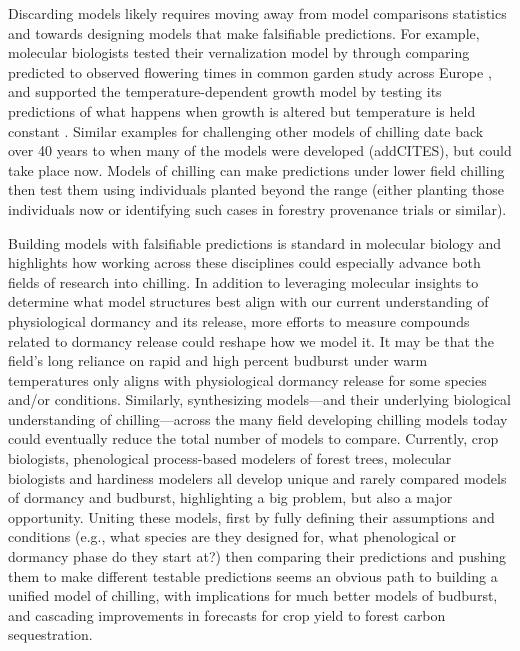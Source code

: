 \documentclass[11pt]{article}
\begin{document}
Discarding models likely requires moving away from model comparisons statistics and towards designing models that make falsifiable predictions. For example, molecular biologists tested their vernalization model by through comparing predicted to observed flowering times in common garden study across Europe \citep[][]{Wilczek:2009oa}, and supported the temperature-dependent growth model by testing its predictions of what happens when growth is altered but temperature is held constant \citep{zhao2020temperature}. Similar examples for challenging other models of chilling date back over 40 years to when many of the models were developed (addCITES), but could take place now. Models of chilling can make predictions under lower field chilling then test them using individuals planted beyond the range (either planting those individuals now or identifying such cases in forestry provenance trials or similar). 

Building models with falsifiable predictions is standard in molecular biology and highlights how working across these disciplines could especially advance both fields of research into chilling. In addition to leveraging molecular insights to determine what model structures best align with our current understanding of physiological dormancy and its release, more efforts to measure compounds related to dormancy release could reshape how we model it. It may be that the field's long reliance on rapid and high percent budburst under warm temperatures only aligns with physiological dormancy release for some species and/or conditions. Similarly, synthesizing models---and their underlying biological understanding of chilling---across the many field developing chilling models today could eventually reduce the total number of models to compare. Currently, crop biologists, phenological process-based modelers of forest trees, molecular biologists and hardiness modelers all develop unique and rarely compared models of dormancy and budburst, highlighting a big problem, but also a major opportunity. Uniting these models, first by fully defining their assumptions and conditions (e.g., what species are they designed for, what phenological or dormancy phase do they start at?) then comparing their predictions and pushing them to make different testable predictions seems an obvious path to building a unified model of chilling, with implications for much better models of budburst, and cascading improvements in forecasts for crop yield to forest carbon sequestration. 
\end{document}
